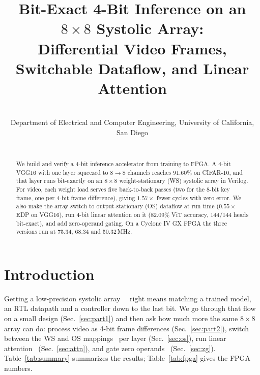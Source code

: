 \documentclass{article}
\title{Bit-Exact 4-Bit Inference on an $8{\times}8$ Systolic Array:\\
Differential Video Frames, Switchable Dataflow, and Linear Attention}
\author{%
  \todo{Name(s)} \\
  Department of Electrical and Computer Engineering, University of California, San Diego\\
  \texttt{\todo{PID(s)}} \\
}
\newcommand{\sld}[1]{\unskip~\cite[#1]{ece284slides}}
\begin{document}
\maketitle

\begin{abstract}
We build and verify a 4-bit inference accelerator from training to FPGA. A 4-bit VGG16 with one layer squeezed to $8{\to}8$
channels reaches 91.60\% on CIFAR-10, and that layer runs bit-exactly on an $8{\times}8$ weight-stationary (WS) systolic array
in Verilog. For video, each weight load serves five back-to-back passes (two for the 8-bit key frame, one per 4-bit frame
difference), giving $1.57\times$ fewer cycles with zero error. We also make the array switch to output-stationary (OS) dataflow
at run time ($0.55\times$ EDP on VGG16), run 4-bit linear attention on it (82.09\% ViT accuracy, 144/144 heads bit-exact), and
add zero-operand gating. On a Cyclone IV GX FPGA the three versions run at 75.34, 68.34 and 50.32\,MHz.
\end{abstract}

\section{Introduction}
Getting a low-precision systolic array~\cite{jouppi2017tpu}\sld{Ch7:p12--20} right means matching a trained model, an RTL
datapath and a controller down to the last bit. We go through that flow on a small design (Sec.~\ref{sec:part1}) and then ask
how much more the same $8{\times}8$ array can do: process video as 4-bit frame differences (Sec.~\ref{sec:part2}), switch between
the WS and OS mappings\sld{Ch7:p22--32} per layer (Sec.~\ref{sec:os}), run linear
attention~\cite{katharopoulos2020linear,mcdermott2026lola} (Sec.~\ref{sec:attn}), and gate zero
operands~\cite{moons2017jssc} (Sec.~\ref{sec:zg}).
Table~\ref{tab:summary} summarizes the results; Table~\ref{tab:fpga} gives the FPGA numbers.
\end{document}
